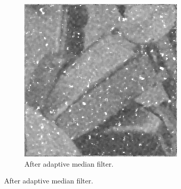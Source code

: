\begin{figure}[H]
\centering
  \begin{subfigure}{\linewidth}
  \centering
    \includegraphics[width = \cutOutWidth]{graphics/complex2_median.png}
    \caption{After adaptive median filter.}
    \label{fig:complex2_median}
  \end{subfigure}
  

\end{figure}
